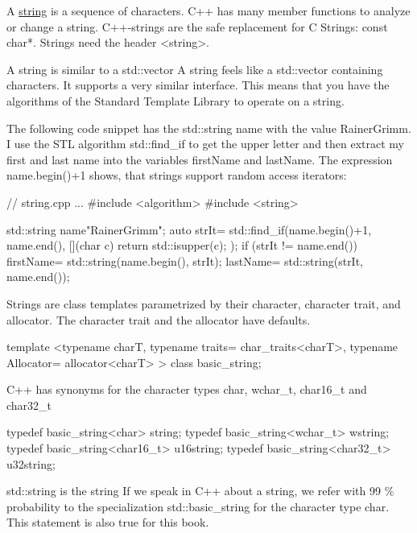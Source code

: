 
A \href{http://en.cppreference.com/w/cpp/string/basic_string}{string} is a sequence of characters. C++ has many member functions to analyze or change a string. C++-strings are the safe replacement for C Strings: const char*. Strings need the header <string>.



\begin{myTip}{A string is similar to a std::vector}
A string feels like a std::vector containing characters. It supports a very similar interface. This means that you have the algorithms of the Standard Template Library to operate on a string.

The following code snippet has the std::string name with the value RainerGrimm. I use the STL algorithm std::find\_if to get the upper letter and then extract my first and last name into the variables firstName and lastName. The expression name.begin()+1 shows, that strings support random access iterators:


\begin{cpp}
// string.cpp
...
#include <algorithm>
#include <string>

std::string name{"RainerGrimm"};
auto strIt= std::find_if(name.begin()+1, name.end(),
						[](char c){ return std::isupper(c); });
if (strIt != name.end()){
	firstName= std::string(name.begin(), strIt);
	lastName= std::string(strIt, name.end());
}
\end{cpp}
\end{myTip}

Strings are class templates parametrized by their character, character trait, and allocator. The character trait and the allocator have defaults.

\begin{cpp}
template <typename charT,
		  typename traits= char_traits<charT>,
		  typename Allocator= allocator<charT> >
class basic_string;
\end{cpp}

C++ has synonyms for the character types char, wchar\_t, char16\_t and char32\_t

\begin{cpp}
typedef basic_string<char> string;
typedef basic_string<wchar_t> wstring;
typedef basic_string<char16_t> u16string;
typedef basic_string<char32_t> u32string;
\end{cpp}

\begin{myTip}{std::string is the string}
If we speak in C++ about a string, we refer with 99 \% probability to the specialization std::basic\_string for the character type char. This statement is also true for this book.
\end{myTip}


























